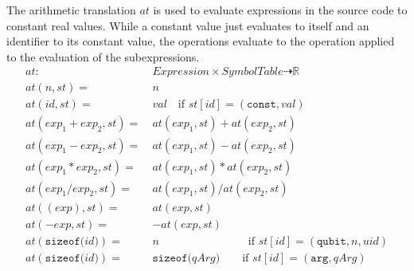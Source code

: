 The arithmetic translation $at$ is used to evaluate expressions in the source code to constant real values. While a constant value just evaluates to itself and an identifier to its constant value, the operations evaluate to the operation applied to the evaluation of the subexpressions. 
\begin{align*}
    at : \ & Expression \times SymbolTable \dashrightarrow \mathbb{R}\\
    at(n, st) = \ & n\\
    at(id, st) = \ & val \quad \text{if } st[id] = (\texttt{const}, val)\\
    at(exp_1 + exp_2, st) = \ & at(exp_1, st) + at(exp_2, st)\\
    at(exp_1 - exp_2, st) = \ & at(exp_1, st) - at(exp_2, st)\\
    at(exp_1 * exp_2, st) = \ & at(exp_1, st) * at(exp_2, st)\\
    at(exp_1 / exp_2, st) = \ & at(exp_1, st) / at(exp_2, st)\\
    at((exp), st) = \ & at(exp, st)\\
    at(-exp, st) = \ & -at(exp, st)\\
    at(\texttt{sizeof(} id \texttt{)}) = \ & n \hspace{8em} \text{if } st[id] = (\texttt{qubit}, n, uid)\\
    at(\texttt{sizeof(} id \texttt{)}) = \ & \texttt{sizeof(} qArg \texttt{)} \texttt \quad \quad \text{if } st[id] = (\texttt{arg}, qArg)
\end{align*}

